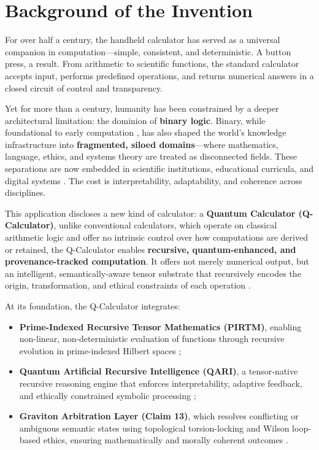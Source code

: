 \documentclass[12pt]{article}
\begin{document}
\section{Background of the Invention}

For over half a century, the handheld calculator has served as a universal companion in computation—simple, consistent, and deterministic. A button press, a result. From arithmetic to scientific functions, the standard calculator accepts input, performs predefined operations, and returns numerical answers in a closed circuit of control and transparency.

Yet for more than a century, humanity has been constrained by a deeper architectural limitation: the dominion of \textbf{binary logic}. Binary, while foundational to early computation \cite{knuth1998art}, has also shaped the world’s knowledge infrastructure into \textbf{fragmented, siloed domains}—where mathematics, language, ethics, and systems theory are treated as disconnected fields. These separations are now embedded in scientific institutions, educational curricula, and digital systems \cite{bengio2009}. The cost is interpretability, adaptability, and coherence across disciplines.

This application discloses a new kind of calculator: a \textbf{Quantum Calculator (Q-Calculator)}, unlike conventional calculators, which operate on classical arithmetic logic and offer no intrinsic control over how computations are derived or retained, the Q-Calculator enables \textbf{recursive, quantum-enhanced, and provenance-tracked computation}. It offers not merely numerical output, but an intelligent, semantically-aware tensor substrate that recursively encodes the origin, transformation, and ethical constraints of each operation \cite{stetar2025recursive, boatright2025recursive}.

At its foundation, the Q-Calculator integrates:
\begin{itemize}
    \item \textbf{Prime-Indexed Recursive Tensor Mathematics (PIRTM)}, enabling non-linear, non-deterministic evaluation of functions through recursive evolution in prime-indexed Hilbert spaces \cite{matsumoto2020, gao2016};
    \item \textbf{Quantum Artificial Recursive Intelligence (QARI)}, a tensor-native recursive reasoning engine that enforces interpretability, adaptive feedback, and ethically constrained symbolic processing \cite{vanosdol2024mqem, gibson2024naturals};
    \item \textbf{Graviton Arbitration Layer (Claim 13)}, which resolves conflicting or ambiguous semantic states using topological torsion-locking and Wilson loop-based ethics, ensuring mathematically and morally coherent outcomes \cite{gibson2024gauge}.
\end{itemize}
\end{document}
